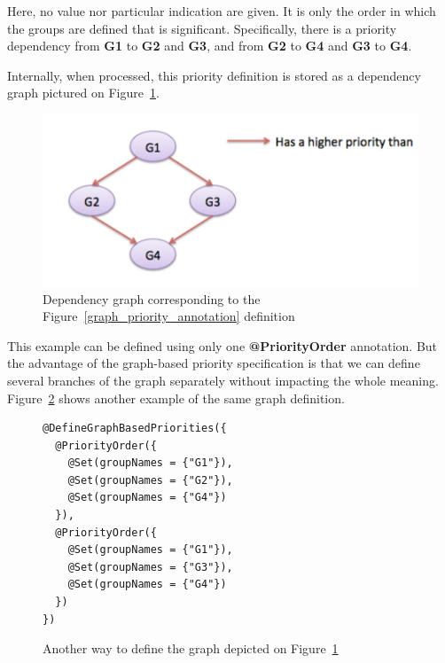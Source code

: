 \documentclass[11pt]{report}
\begin{document}
Here, no value nor particular indication are given. It is only the order in which the groups are defined that is significant. Specifically, there is a priority dependency from \textbf{G1} to \textbf{G2} and \textbf{G3}, and from \textbf{G2} to \textbf{G4} and \textbf{G3} to \textbf{G4}.

Internally, when processed, this priority definition is stored as a dependency graph pictured on Figure~\ref{fig:graph}.
\begin{figure}[!ht]
      \begin{minipage}[c]{\textwidth}
      \centering
      \includegraphics[scale=0.5]{pictures/graph.pdf}
      \end{minipage}
      \caption{Dependency graph corresponding to the Figure~\ref{graph_priority_annotation} definition}
      \label{fig:graph} 
\end{figure}
This example can be defined using only one \textbf{@PriorityOrder} annotation. But the advantage of the graph-based priority specification is that we can define several branches of the graph separately without impacting the whole meaning. Figure~\ref{graph_priority_definition_2} shows another example of the same graph definition.

\begin{figure}[!ht]
	\lstset{language=java, numbers=left, numberstyle=\tiny, stepnumber=1, numbersep=5pt, basicstyle=\footnotesize}
	\begin{lstlisting}[frame=single]
@DefineGraphBasedPriorities({
  @PriorityOrder({
    @Set(groupNames = {"G1"}),
    @Set(groupNames = {"G2"}),
    @Set(groupNames = {"G4"})
  }),
  @PriorityOrder({
    @Set(groupNames = {"G1"}),
    @Set(groupNames = {"G3"}),
    @Set(groupNames = {"G4"})
  })
})
 	\end{lstlisting}
\caption{Another way to define the graph depicted on Figure~\ref{fig:graph}}
\label{graph_priority_definition_2}
\end{figure}
\end{document}
